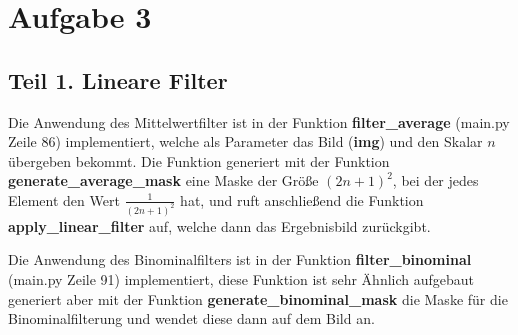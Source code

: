 \documentclass[12pt]{article}
\begin{document}

\section*{Aufgabe 3}
\subsection*{Teil 1. Lineare Filter}
Die Anwendung des Mittelwertfilter ist in der Funktion \textbf{filter\_average} (main.py Zeile 86) implementiert, welche als Parameter das Bild (\textbf{img}) und den Skalar $n$ übergeben bekommt.
Die Funktion generiert mit der Funktion \textbf{generate\_average\_mask} eine Maske der Größe $(2n+1)^2$, bei der jedes Element den Wert $\frac{1}{(2n+1)^2}$ hat, und ruft anschließend die Funktion \textbf{apply\_linear\_filter} auf, welche dann das Ergebnisbild zurückgibt.

Die Anwendung des Binominalfilters ist in der Funktion \textbf{filter\_binominal} (main.py Zeile 91) implementiert, diese Funktion ist sehr Ähnlich aufgebaut generiert aber mit der Funktion \textbf{generate\_binominal\_mask} die Maske für die Binominalfilterung und wendet diese dann auf dem Bild an.
\end{document}
